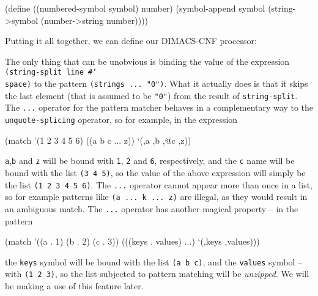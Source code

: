 \begin{Snippet}
(define ((numbered-symbol symbol) number)
  (symbol-append symbol (string->symbol (number->string number))))
\end{Snippet}

Putting it all together, we can define our DIMACS-CNF
processor:


The only thing that can be unobvious is binding the value
of the expression \texttt{(string-split line \#\char`\\space)}
to the pattern \texttt{(strings ... "0")}. What it actually
does is that it skips the last element (that is assumed to
be \texttt{"0"}) from the result of \texttt{string-split}.
The \texttt{...} operator for the pattern matcher behaves
in a complementary way to the \texttt{unquote-splicing}
operator, so for example, in the expression
\begin{Snippet}
(match '(1 2 3 4 5 6)
  ((a b c ... z))
  `(,a ,b ,@c ,z))
\end{Snippet}
\texttt{a},\texttt{b} and \texttt{z} will be bound with
\texttt{1}, \texttt{2} and \texttt{6}, respectively, and the
\texttt{c} name will be bound with the list \texttt{(3 4 5)},
so the value of the above expression will simply be the list
\texttt{(1 2 3 4 5 6)}. The \texttt{...} operator cannot
appear more than once in a list, so for example patterns like
\texttt{(a ... k ... z)} are illegal, as they would result
in an ambiguous match. The \texttt{...} operator has
another magical property -- in the pattern
\begin{Snippet}
(match '((a . 1) (b . 2) (c . 3))
  (((keys . values) ...)
   `(,keys ,values)))
\end{Snippet}
the \texttt{keys} symbol will be bound with the list \texttt{(a b c)},
and the \texttt{values} symbol -- with \texttt{(1 2 3)}, so the
list subjected to pattern matching will be \textit{unzipped}.
We will be making a use of this feature later.

